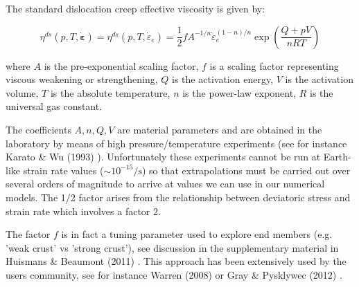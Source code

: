 
The standard dislocation creep effective viscosity is given by:
\begin{mdframed}[backgroundcolor=blue!5]
\[
\eta^{ds}(p,T,\dot{\bm \varepsilon})
=\eta^{ds}(p,T,\dot{\varepsilon}_e)
= \frac{1}{2} f A^{-1/n} \dot{\varepsilon}_{e}^{(1-n)/n} \exp \left( \frac{Q+pV}{nRT}  \right)
\] 
\end{mdframed}
where $A$ is the pre-exponential scaling factor, $f$ is a scaling factor
representing viscous weakening or strengthening, $Q$ is the activation energy, 
$V$ is the activation volume, $T$ is the absolute temperature, $n$ is the power-law 
exponent, $R$ is the universal gas constant. 

The coefficients $A,n,Q,V$ are material parameters and are obtained in the laboratory 
by means of high pressure/temperature experiments (see for instance Karato \& Wu (1993) \cite{kawu93}). 
Unfortunately these experiments cannot be run at Earth-like strain rate 
values ($\sim 10^{-15}\si{\per\second}$)
so that extrapolations must be carried out over several orders of magnitude to 
arrive at values we can use in our numerical models. 
The 1/2 factor arises from the relationship between deviatoric stress and strain rate which 
involves a factor 2.

The factor $f$ is in fact a tuning parameter used to explore end members (e.g. 'weak crust' 
vs 'strong crust'), see discussion in the supplementary material in 
Huismans \& Beaumont (2011) \cite{hube11}. 
This approach has been extensively used by the \sopale users community, see 
for instance Warren \etal (2008) \cite{wabj08,wabj08b,wabj08c} 
or Gray \& Pysklywec (2012) \cite{grpy12}.


